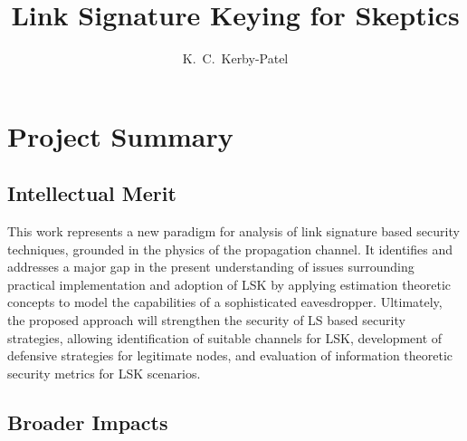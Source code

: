 \documentclass[12pt, titlepage]{article}
\title{Link Signature Keying for Skeptics}
\author{{\normalsize K.~C.~Kerby-Patel}}
\date{}
\begin{document}

\begin{titlepage}
\maketitle
\end{titlepage}
\section*{Project Summary}


\subsection*{Intellectual Merit}
This work represents a new paradigm for analysis of link signature based security techniques, grounded in the physics of the propagation channel.  It identifies and addresses a major gap in the present understanding of issues surrounding practical implementation and adoption of LSK by applying estimation theoretic concepts to model the capabilities of a sophisticated eavesdropper.  Ultimately, the proposed approach will strengthen the security of LS based security strategies, allowing identification of suitable channels for LSK, development of defensive strategies for legitimate nodes, and evaluation of information theoretic security metrics for LSK scenarios.

\subsection*{Broader Impacts}


\newpage
\end{document}
